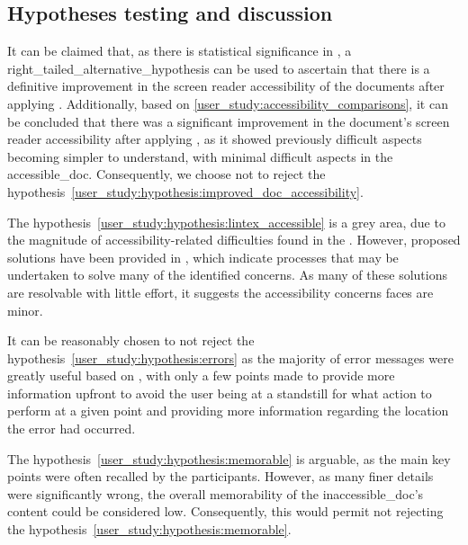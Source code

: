 \subsection{\nmu Hypotheses \nmu testing and discussion}\label{user_study:hypotheses_testing_and_discussion}
It can be claimed that, as there is statistical significance in , a \gls{right_tailed_alternative_hypothesis} can be used to ascertain that there is a definitive improvement in the screen reader accessibility of the documents after applying \lintex. Additionally, based on \cref{user_study:accessibility_comparisons}, it can be concluded that there was a significant improvement in the document's screen reader accessibility after applying \lintex, as it showed previously difficult aspects becoming simpler to understand, with minimal difficult aspects in the \gls{accessible_doc}. Consequently, we choose not to reject the hypothesis~\ref{user_study:hypothesis:improved_doc_accessibility}.

The hypothesis~\ref{user_study:hypothesis:lintex_accessible} is a grey area, due to the magnitude of accessibility-related difficulties found in the . However, proposed solutions have been provided in , which indicate processes that may be undertaken to solve many of the identified concerns. As many of these solutions are resolvable with little effort, it suggests the accessibility concerns \lintexspaced faces are minor.

It can be reasonably chosen to not reject the hypothesis~\ref{user_study:hypothesis:errors} as the majority of error messages were greatly useful based on , with only a few points made to provide more information upfront to avoid the user being at a standstill for what action to perform at a given point and providing more information regarding the location the error had occurred.

The hypothesis~\ref{user_study:hypothesis:memorable} is arguable, as the main key points were often recalled by the participants. However, as many finer details were significantly wrong, the overall memorability of the \gls{inaccessible_doc}'s content could be considered low. Consequently, this would permit not rejecting the hypothesis~\ref{user_study:hypothesis:memorable}.